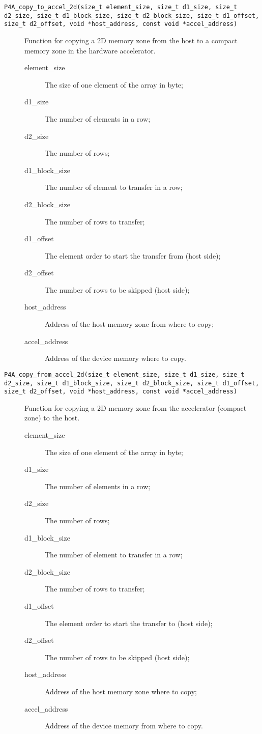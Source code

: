 \documentclass[a4paper]{article}
\begin{document}
\begin{description}
\item[\texttt{P4A\_copy\_to\_accel\_2d(size\_t element\_size, size\_t
    d1\_size, size\_t d2\_size, size\_t d1\_block\_size, size\_t
    d2\_block\_size, size\_t d1\_offset, size\_t d2\_offset, void
    *host\_address, const void *accel\_address)}] Function for copying
  a 2D memory zone from the host to a compact memory zone in the
  hardware accelerator.

  \begin{description}
  \item[element\_size] The size of one element of the array in byte;
  \item[d1\_size] The number of elements in a row;
  \item[d2\_size] The number of rows;
  \item[d1\_block\_size] The number of element to transfer in a row;
  \item[d2\_block\_size] The number of rows to transfer;
  \item[d1\_offset] The element order to start the transfer from (host
    side);
  \item[d2\_offset] The number of rows to be skipped (host side);
  \item[host\_address] Address of the host memory zone from where to copy;
  \item[accel\_address] Address of the device memory where to copy.
  \end{description}


\item[\texttt{P4A\_copy\_from\_accel\_2d(size\_t element\_size, size\_t
    d1\_size, size\_t d2\_size, size\_t d1\_block\_size, size\_t
    d2\_block\_size, size\_t d1\_offset, size\_t d2\_offset, void
    *host\_address, const void *accel\_address)}] Function for copying
  a 2D memory zone from the accelerator (compact zone) to the host.

  \begin{description}
  \item[element\_size] The size of one element of the array in byte;
  \item[d1\_size] The number of elements in a row;
  \item[d2\_size] The number of rows;
  \item[d1\_block\_size] The number of element to transfer in a row;
  \item[d2\_block\_size] The number of rows to transfer;
  \item[d1\_offset] The element order to start the transfer
    to (host side);
  \item[d2\_offset] The number of rows to be skipped (host side);
  \item[host\_address] Address of the host memory zone where to copy;
  \item[accel\_address] Address of the device memory from where to copy.
  \end{description}


\end{description}
\end{document}

